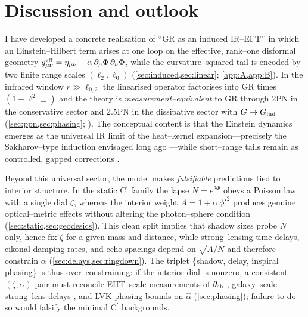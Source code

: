 \documentclass{iopjournal}
\begin{document}
\section{Discussion and outlook}\label{sec:discussion}
I have developed a concrete realisation of ``GR as an induced IR–EFT’’ in which an Einstein–Hilbert term arises at one loop on the effective, rank–one disformal geometry $g^{\rm eff}_{\mu\nu}=\eta_{\mu\nu}+\alpha\,\partial_\mu\Phi\,\partial_\nu\Phi$, while the curvature–squared tail is encoded by two finite range scales $(\ell_2,\ell_0)$ (\cref{sec:induced,sec:linear}; \cref{app:A,app:B}). In the infrared window $r\gg \ell_{0,2}$ the linearised operator factorises into GR times $(1+\ell^2\Box)$ and the theory is \emph{measurement–equivalent} to GR through 2PN in the conservative sector and 2.5PN in the dissipative sector with $G\to G_{\rm ind}$ (\cref{sec:ppn,sec:phasing}; \cite{Will2014LRR,PoissonWill2014,Blanchet2014LRR}). The conceptual content is that the Einstein dynamics emerges as the universal IR limit of the heat–kernel expansion—precisely the Sakharov–type induction envisaged long ago \cite{Sakharov1967,Visser2002}—while short–range tails remain as controlled, gapped corrections \cite{ParkerToms,Vassilevich2003,BarvinskyVilkovisky,Donoghue1994}.

Beyond this universal sector, the model makes \emph{falsifiable} predictions tied to interior structure. In the static C$^\prime$ family the lapse $N=e^{2\Phi}$ obeys a Poisson law with a single dial $\zeta$, whereas the interior weight $A=1+\alpha\,\phi'^2$ produces genuine optical–metric effects without altering the photon–sphere condition (\cref{sec:static,sec:geodesics}). This clean split implies that shadow sizes probe $N$ only, hence fix $\zeta$ for a given mass and distance, while strong–lensing time delays, eikonal damping rates, and echo spacings depend on $\sqrt{A/N}$ and therefore constrain $\alpha$ (\cref{sec:delays,sec:ringdown}). The triplet \{shadow, delay, inspiral phasing\} is thus over–constraining: if the interior dial is nonzero, a consistent $(\zeta,\alpha)$ pair must reconcile EHT–scale measurements of $\theta_{\rm sh}$ \cite{EHT2019M87,EHT2022SgrA}, galaxy–scale strong–lens delays \cite{SchneiderEhlersFalco1992,Perlick2004LRR}, and LVK phasing bounds on $\widehat\alpha$ (\cref{sec:phasing}); failure to do so would falsify the minimal C$^\prime$ backgrounds.
\end{document}
